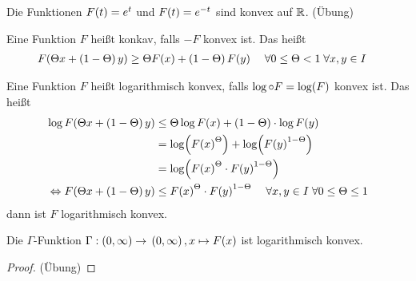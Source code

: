 \begin{beispiel}
    Die Funktionen $F\of{t} = e^{t}$ und $F\of{t} = e^{-t}$ sind konvex auf $\mathbb{R}$. (Übung)
\end{beispiel}

\begin{definition}
    Eine Funktion $F$ heißt konkav, falls $-F$ konvex ist. Das heißt
    \begin{align*}
        F\of{\Theta x + \pair{1-\Theta}y} &\geq \Theta F\of{x} + \pair{1-\Theta}F\of{y}\quad\fa 0\leq \Theta < 1\fa x,y\in I
    \end{align*}
\end{definition}

\begin{definition}
    Eine Funktion $F$ heißt logarithmisch konvex, falls $\log \circ F = \log\of{F}$ konvex ist. Das heißt
    \begin{align*}
        \log F\of{\Theta x + \pair{1-\Theta} y} &\leq \Theta\log F\of{x} + \pair{1-\Theta}\cdot \log F\of{y}\\
        &= \log\of{F\of{x}^{\Theta}} + \log\of{F\of{y}^{1-\Theta}}\\
        &= \log\of{F\of{x}^{\Theta}\cdot F\of{y}^{1-\Theta}}\\
        \equivalent F\of{\Theta x + \pair{1-\Theta}y} &\leq F\of{x}^{\Theta} \cdot F\of{y}^{1-\Theta}\quad\fa x,y\in I\fa 0\leq \Theta \leq 1
    \end{align*}
    dann ist $F$ logarithmisch konvex.
\end{definition}

\begin{satz} %
    Die $\Gamma$-Funktion $\Gamma: \pair{0, \infty}\fromto \pair{0, \infty}, x\mapsto F\of{x}$ ist logarithmisch konvex.
    \begin{proof}
    (Übung)
    \end{proof}
\end{satz}

